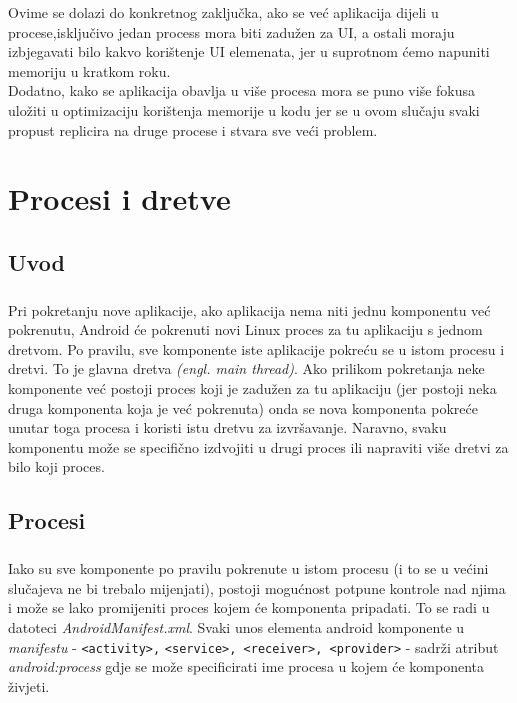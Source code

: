 \documentclass[times, utf8, zavrsni]{fer}
\begin{document}
Ovime se dolazi do konkretnog zaključka, ako se već aplikacija dijeli u procese,\linebreak isključivo jedan process mora biti zadužen za UI, a ostali moraju izbjegavati bilo kakvo korištenje UI elemenata, jer u suprotnom ćemo napuniti memoriju u kratkom roku.\\

Dodatno, kako se aplikacija obavlja u više procesa mora se puno više fokusa uložiti u optimizaciju korištenja memorije u kodu jer se u ovom slučaju svaki propust replicira na druge procese i stvara sve veći problem.

\pagebreak
\chapter{Procesi i dretve}
\section{Uvod}
\paragraph{}
Pri pokretanju nove aplikacije, ako aplikacija nema niti jednu komponentu već pokrenutu, Android će pokrenuti novi Linux proces za tu aplikaciju s jednom dretvom. Po pravilu, sve komponente iste aplikacije pokreću se u istom procesu i dretvi. To je glavna dretva \textit{(engl. main thread)}. Ako prilikom pokretanja neke komponente već postoji proces koji je zadužen za tu aplikaciju (jer postoji neka druga komponenta koja je već pokrenuta) onda se nova komponenta pokreće unutar toga procesa i koristi istu dretvu za izvršavanje. Naravno, svaku komponentu može se specifično izdvojiti u drugi proces ili napraviti više dretvi za bilo koji proces.

\section{Procesi}
\paragraph{}
Iako su sve komponente po pravilu pokrenute u istom procesu (i to se u većini slučajeva ne bi trebalo mijenjati), postoji mogućnost potpune kontrole nad njima i može se lako promijeniti proces kojem će komponenta pripadati. To se radi u datoteci \textit{AndroidManifest.xml}. Svaki unos elementa android komponente u \textit{manifestu} - \verb|<activity>,| \verb|<service>, <receiver>, <provider>| - sadrži atribut \textit{android:process} gdje se može specificirati ime procesa u kojem će komponenta živjeti.\newpage
\end{document}
